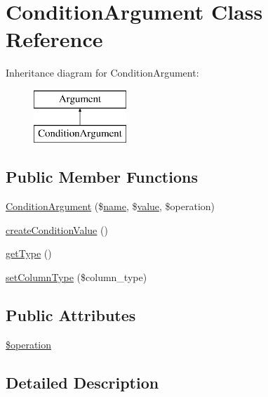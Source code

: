 \hypertarget{classConditionArgument}{}\section{Condition\+Argument Class Reference}
\label{classConditionArgument}
Inheritance diagram for Condition\+Argument\+:\begin{figure}[H]
\begin{center}
\leavevmode
\includegraphics[height=2.000000cm]{classConditionArgument}
\end{center}
\end{figure}
\subsection*{Public Member Functions}
\begin{DoxyCompactItemize}
\item 
\hyperlink{classConditionArgument_a9adc8c95c5f227954e7b6c46e89a5b65}{Condition\+Argument} (\$\hyperlink{common_8js_a22c29d2aa8ed6161ce8faa718ef76e68}{name}, \$\hyperlink{jquery_8js_abe5393d870043cf6aaa1d5ad5fce755c}{value}, \$operation)
\item 
\hyperlink{classConditionArgument_a2f1c182c8765ebc62d2d50f575954982}{create\+Condition\+Value} ()
\item 
\hyperlink{classConditionArgument_a39922137cc67e751a5577850bce3cac7}{get\+Type} ()
\item 
\hyperlink{classConditionArgument_a7ee8444a1bfa4763458a006e0fd6ef1e}{set\+Column\+Type} (\$column\+\_\+type)
\end{DoxyCompactItemize}
\subsection*{Public Attributes}
\begin{DoxyCompactItemize}
\item 
\hyperlink{classConditionArgument_acfccaada47560781bfbdf51086ce3869}{\$operation}
\end{DoxyCompactItemize}


\subsection{Detailed Description}


